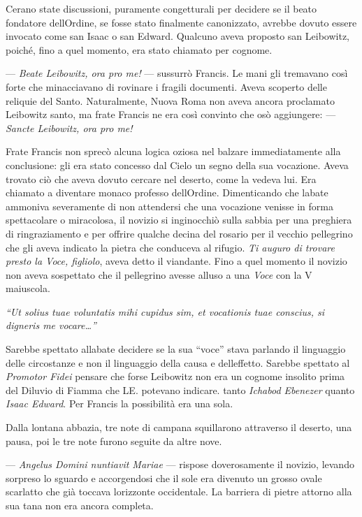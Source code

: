 C\textquotesingle erano state discussioni, puramente congetturali per
decidere se il beato fondatore dell\textquotesingle Ordine, se fosse
stato finalmente canonizzato, avrebbe dovuto essere invocato come san
Isaac o san Edward. Qualcuno aveva proposto san Leibowitz, poiché, fino
a quel momento, era stato chiamato per cognome.

--- \emph{Beate Leibowitz, ora pro me!} --- sussurrò Francis. Le mani
gli tremavano così forte che minacciavano di rovinare i fragili
documenti. Aveva scoperto delle reliquie del Santo. Naturalmente, Nuova
Roma non aveva ancora proclamato Leibowitz santo, ma frate Francis ne
era così convinto che osò aggiungere: --- \emph{Sancte Leibowitz, ora
	pro me!}

Frate Francis non sprecò alcuna logica oziosa nel balzare immediatamente
alla conclusione: gli era stato concesso dal Cielo un segno della sua
vocazione. Aveva trovato ciò che aveva dovuto cercare nel deserto, come
la vedeva lui. Era chiamato a diventare monaco professo
dell\textquotesingle Ordine. Dimenticando che l\textquotesingle abate
ammoniva severamente di non attendersi che una vocazione venisse in
forma spettacolare o miracolosa, il novizio si inginocchiò sulla sabbia
per una preghiera di ringraziamento e per offrire qualche decina del
rosario per il vecchio pellegrino che gli aveva indicato la pietra che
conduceva al rifugio. \emph{Ti auguro di trovare presto la Voce,
	figliolo}, aveva detto il viandante. Fino a quel momento il novizio non
aveva sospettato che il pellegrino avesse alluso a una \emph{Voce} con
la V maiuscola.

\emph{``Ut solius tuae voluntatis mihi cupidus sim, et vocationis tuae
	conscius, si digneris me vocare\ldots''}

Sarebbe spettato all\textquotesingle abate decidere se la sua ``voce''
stava parlando il linguaggio delle circostanze e non il linguaggio della
causa e dell\textquotesingle effetto. Sarebbe spettato al \emph{Promotor
	Fidei} pensare che forse Leibowitz non era un cognome insolito prima del
Diluvio di Fiamma che LE. potevano indicare. tanto \emph{Ichabod
	Ebenezer} quanto \emph{Isaac Edward}. Per Francis la possibilità era una
sola.

Dalla lontana abbazia, tre note di campana squillarono attraverso il
deserto, una pausa, poi le tre note furono seguite da altre nove.

--- \emph{Angelus Domini nuntiavit Mariae} --- rispose doverosamente il
novizio, levando sorpreso lo sguardo e accorgendosi che il sole era
divenuto un grosso ovale scarlatto che già toccava
l\textquotesingle orizzonte occidentale. La barriera di pietre attorno
alla sua tana non era ancora completa.

